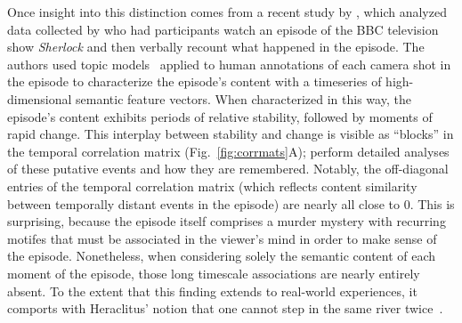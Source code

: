 \documentclass{article}
\begin{document}
Once insight into this distinction comes from a recent study by \cite{HeusEtal18c}, which analyzed data collected by \citep{ChenEtal17} who had participants watch an episode of the BBC television show \textit{Sherlock} and then verbally recount what happened in the episode.  The authors used topic models~\citep{BleiEtal03} applied to human annotations of each camera shot in the episode to characterize the episode's content with a timeseries of high-dimensional semantic feature vectors.  When characterized in this way, the episode's content exhibits periods of relative stability, followed by moments of rapid change. This interplay between stability and change is visible as ``blocks'' in the temporal correlation matrix (Fig.~\ref{fig:corrmats}A); \citep{HeusEtal18c} perform detailed analyses of these putative events and how they are remembered.  Notably, the off-diagonal entries of the temporal correlation matrix (which reflects content similarity between temporally distant events in the episode) are nearly all close to 0.  This is surprising, because the episode itself comprises a murder mystery with recurring motifes that must be associated in the viewer's mind in order to make sense of the episode.  Nonetheless, when considering solely the semantic content of each moment of the episode, those long timescale associations are nearly entirely absent.  To the extent that this finding extends to real-world experiences, it comports with Heraclitus' notion that one cannot step in the same river twice~\citep{Hera}.
\end{document}
